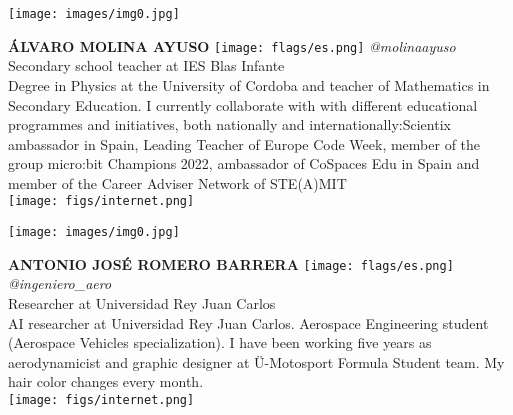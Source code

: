 \noindent
\begin{minipage}{0.3\textwidth}
\centering
\texttt{[image: images/img0.jpg]}
\end{minipage}
\hfill
\begin{minipage}{0.6\textwidth}\raggedright
\color{color1}\uppercase{\textbf{Álvaro Molina Ayuso}}
\color{color2}\hspace{0.2cm}\texttt{[image: flags/es.png]}
\hspace{0.2cm}\textit{@molinaayuso}
\\
Secondary school teacher at IES Blas Infante\\
{\footnotesize Degree in Physics at the University of Cordoba and teacher of Mathematics in Secondary Education. I currently collaborate with with different educational programmes and initiatives, both nationally and internationally:Scientix ambassador in Spain, Leading Teacher of Europe Code Week, member of the group micro:bit Champions 2022, ambassador of CoSpaces Edu in Spain and member of the Career Adviser Network of STE(A)MIT}\\
\texttt{[image: figs/internet.png]}
\end{minipage}
\newline\newline\newline

\noindent
\begin{minipage}{0.3\textwidth}
\centering
\texttt{[image: images/img0.jpg]}
\end{minipage}
\hfill
\begin{minipage}{0.6\textwidth}\raggedright
\color{color1}\uppercase{\textbf{Antonio José Romero Barrera}}
\color{color2}\hspace{0.2cm}\texttt{[image: flags/es.png]}
\hspace{0.2cm}\textit{@ingeniero\_aero}
\\
Researcher at Universidad Rey Juan Carlos\\
{\footnotesize AI researcher at Universidad Rey Juan Carlos. Aerospace Engineering student (Aerospace Vehicles specialization). I have been working five years as aerodynamicist and graphic designer at Ü-Motosport Formula Student team. My hair color changes every month.}\\
\texttt{[image: figs/internet.png]}
\end{minipage}
\newline\newline\newline

